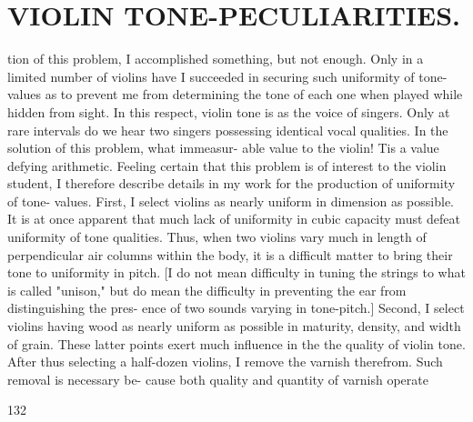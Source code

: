 \documentclass{article}
\begin{document}
\section*{VIOLIN TONE-PECULIARITIES.}
tion of this problem, I accomplished something, but not enough. Only in a limited number of violins have I succeeded in securing such uniformity of tone- values as to prevent me from determining the tone of each one when played while hidden from sight. In this respect, violin tone is as the voice of singers. Only at rare intervals do we hear two singers possessing identical vocal qualities. In the solution of this problem, what immeasur- able value to the violin! Tis a value defying arithmetic. Feeling certain that this problem is of interest to the violin student, I therefore describe details in my work for the production of uniformity of tone- values. First, I select violins as nearly uniform in dimension as possible. It is at once apparent that much lack of uniformity in cubic capacity must defeat uniformity of tone qualities. Thus, when two violins vary much in length of perpendicular air columns within the body, it is a difficult matter to bring their tone to uniformity in pitch. [I do not mean difficulty in tuning the strings to what is called "unison," but do mean the difficulty in preventing the ear from distinguishing the pres- ence of two sounds varying in tone-pitch.] Second, I select violins having wood as nearly uniform as possible in maturity, density, and width of grain. These latter points exert much influence in the the quality of violin tone. After thus selecting a half-dozen violins, I remove the varnish therefrom. Such removal is necessary be- cause both quality and quantity of varnish operate

132
\end{document}
